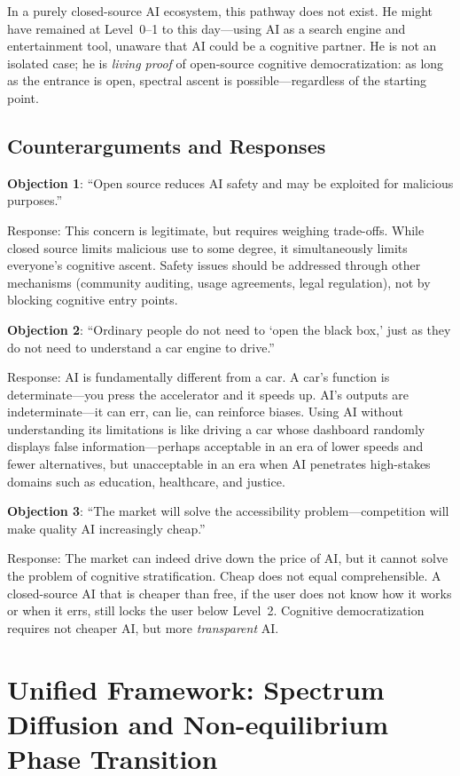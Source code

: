 ﻿\documentclass[12pt,a4paper]{article}
\begin{document}
In a purely closed-source AI ecosystem, this pathway does not exist. He might have remained at Level~0--1 to this day---using AI as a search engine and entertainment tool, unaware that AI could be a cognitive partner. He is not an isolated case; he is \emph{living proof} of open-source cognitive democratization: as long as the entrance is open, spectral ascent is possible---regardless of the starting point.

\subsection{Counterarguments and Responses}

\textbf{Objection 1}: ``Open source reduces AI safety and may be exploited for malicious purposes.''

Response: This concern is legitimate, but requires weighing trade-offs. While closed source limits malicious use to some degree, it simultaneously limits everyone's cognitive ascent. Safety issues should be addressed through other mechanisms (community auditing, usage agreements, legal regulation), not by blocking cognitive entry points.

\textbf{Objection 2}: ``Ordinary people do not need to `open the black box,' just as they do not need to understand a car engine to drive.''

Response: AI is fundamentally different from a car. A car's function is determinate---you press the accelerator and it speeds up. AI's outputs are indeterminate---it can err, can lie, can reinforce biases. Using AI without understanding its limitations is like driving a car whose dashboard randomly displays false information---perhaps acceptable in an era of lower speeds and fewer alternatives, but unacceptable in an era when AI penetrates high-stakes domains such as education, healthcare, and justice.

\textbf{Objection 3}: ``The market will solve the accessibility problem---competition will make quality AI increasingly cheap.''

Response: The market can indeed drive down the price of AI, but it cannot solve the problem of cognitive stratification. Cheap does not equal comprehensible. A closed-source AI that is cheaper than free, if the user does not know how it works or when it errs, still locks the user below Level~2. Cognitive democratization requires not cheaper AI, but more \emph{transparent} AI.

\section{Unified Framework: Spectrum Diffusion and Non-equilibrium Phase Transition}
\end{document}

